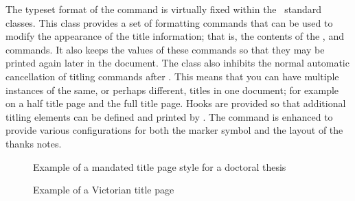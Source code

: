 \begin{comment}
Figures~\ref{fig:titleTH} and~\ref{fig:titleDB}, for example, 
show title pages created using normal \ltx, without bothering 
with \cmd{\maketitle}.
\end{comment}

   The typeset format of the \cmd{\maketitle} command is virtually fixed
within the \ltx\ standard classes. This class
provides a set of formatting commands that can be used to modify
the appearance of the title information; that is, the contents of
the \cmd{\title}, \cmd{\author} and \cmd{\date} commands. 
It also keeps the values
of these commands so that they may be printed again later in the
document.
   The class also inhibits the normal automatic cancellation of titling
commands after \cmd{\maketitle}. This means that you can have multiple
instances of the same, or perhaps different, titles in one document;
for example on a half title page and the
full title page.
Hooks are provided so that additional titling elements can be defined
and printed by \cmd{\maketitle}.
  The \cmd{\thanks} command is enhanced to provide various configurations
for both the marker symbol and the layout of the thanks notes.

\begin{figure}
\centering
\begin{showtitle}
\titleDS
\end{showtitle}
\caption{Example of a mandated title page style for a doctoral thesis}\label{figure:titleDS}
\end{figure}

\begin{figure}%
\centering
{\titleRB}
\caption{Example of a Victorian title page}\label{figure:titleRB}
\end{figure}

